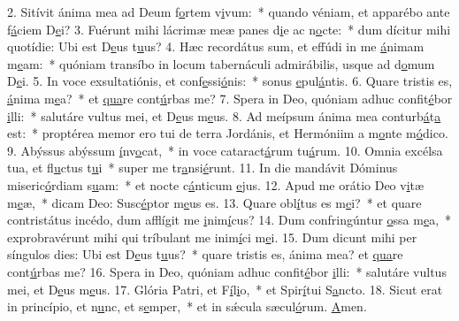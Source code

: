2. Sitívit ánima mea ad Deum f\uline{o}rtem v\uline{i}vum:~* quando véniam, et apparébo ante f\uline{á}ciem D\uline{e}i?
3. Fuérunt mihi lácrimæ meæ panes d\uline{i}e ac n\uline{o}cte:~* dum dícitur mihi quotídie: Ubi est D\uline{e}us t\uline{u}us?
4. Hæc recordátus sum, et effúdi in me \uline{á}nimam m\uline{e}am:~* quóniam transíbo in locum tabernáculi admirábilis, usque ad d\uline{o}mum D\uline{e}i.
5. In voce exsultatiónis, et conf\uline{e}ssi\uline{ó}nis:~* sonus \uline{e}pul\uline{á}ntis.
6. Quare tristis es, \uline{á}nima m\uline{e}a?~* et \uline{qua}re cont\uline{ú}rbas me?
7. Spera in Deo, quóniam adhuc confit\uline{é}bor \uline{i}lli:~* salutáre vultus mei, et D\uline{e}us m\uline{e}us.
8. Ad meípsum ánima mea conturb\uline{á}t\uline{a} est:~* proptérea memor ero tui de terra Jordánis, et Hermóniim a m\uline{o}nte m\uline{ó}dico.
9. Abýssus abýssum \uline{í}nv\uline{o}cat,~* in voce cataract\uline{á}rum tu\uline{á}rum.
10. Omnia excélsa tua, et fl\uline{u}ctus t\uline{u}i~* super me tr\uline{a}nsi\uline{é}runt.
11. In die mandávit Dóminus miseric\uline{ó}rdiam s\uline{u}am:~* et nocte c\uline{á}nticum \uline{e}jus.
12. Apud me orátio Deo v\uline{i}tæ m\uline{e}æ,~* dicam Deo: Susc\uline{é}ptor m\uline{e}us es.
13. Quare obl\uline{í}tus es m\uline{e}i?~* et quare contristátus incédo, dum afflígit me \uline{i}nim\uline{í}cus?
14. Dum confringúntur \uline{o}ssa m\uline{e}a,~* exprobravérunt mihi qui tríbulant me inim\uline{í}ci m\uline{e}i.
15. Dum dicunt mihi per síngulos dies: Ubi est D\uline{e}us t\uline{u}us?~* quare tristis es, ánima mea? et \uline{qua}re cont\uline{ú}rbas me?
16. Spera in Deo, quóniam adhuc confit\uline{é}bor \uline{i}lli:~* salutáre vultus mei, et D\uline{e}us m\uline{e}us.
17. Glória Patri, et F\uline{í}l\uline{i}o,~* et Spir\uline{í}tui S\uline{a}ncto.
18. Sicut erat in princípio, et n\uline{u}nc, et s\uline{e}mper,~* et in sǽcula sæcul\uline{ó}rum. \uline{A}men.
